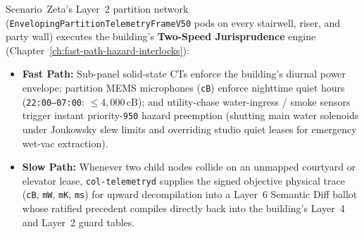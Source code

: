 Scenario~Zeta's Layer~2 partition network (\texttt{EnvelopingPartitionTelemetryFrameV50} pods on every stairwell, riser, and party wall) executes the building's \textbf{Two-Speed Jurisprudence} engine (Chapter~\ref{ch:fast-path-hazard-interlocks}):
\begin{itemize}
    \item \textbf{Fast Path:} Sub-panel solid-state CTs enforce the building's diurnal power envelope; partition MEMS microphones (\texttt{cB}) enforce nighttime quiet hours (\texttt{22:00--07:00}: $\le 4{,}000\,\mathrm{cB}$); and utility-chase water-ingress / smoke sensors trigger instant priority-\texttt{950} hazard preemption (shutting main water solenoids under Joukowsky slew limits and overriding studio quiet leases for emergency wet-vac extraction).
    \item \textbf{Slow Path:} Whenever two child nodes collide on an unmapped courtyard or elevator lease, \texttt{col-telemetryd} supplies the signed objective physical trace (\texttt{cB}, \texttt{mW}, \texttt{mK}, \texttt{ms}) for upward decompilation into a Layer~6 Semantic Diff ballot whose ratified precedent compiles directly back into the building's Layer~4 and Layer~2 guard tables.
\end{itemize}
